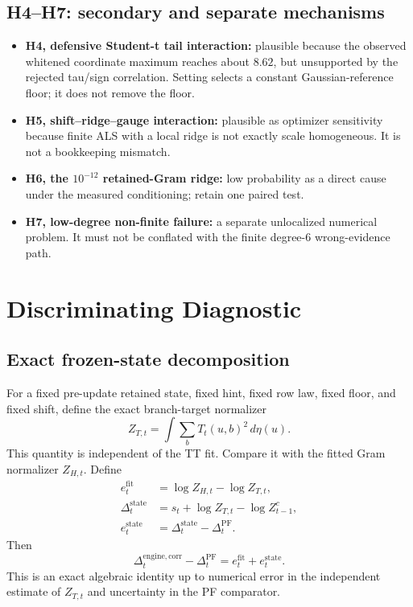 \documentclass[11pt]{article}
\begin{document}
\subsection{H4--H7: secondary and separate mechanisms}

\begin{itemize}
\item \textbf{H4, defensive Student-t tail interaction:} plausible because
the observed whitened coordinate maximum reaches about $8.62$, but unsupported
by the rejected tau/sign correlation. Setting 
selects a constant Gaussian-reference floor; it does not remove the floor.
\item \textbf{H5, shift--ridge--gauge interaction:} plausible as optimizer
sensitivity because finite ALS with a local ridge is not exactly scale
homogeneous. It is not a bookkeeping mismatch.
\item \textbf{H6, the $10^{-12}$ retained-Gram ridge:} low probability as a
direct cause under the measured conditioning; retain one paired test.
\item \textbf{H7, low-degree non-finite failure:} a separate unlocalized
numerical problem. It must not be conflated with the finite degree-6
wrong-evidence path.
\end{itemize}

\section{Discriminating Diagnostic}

\subsection{Exact frozen-state decomposition}

For a fixed pre-update retained state, fixed hint, fixed row law, fixed floor,
and fixed shift, define the exact branch-target normalizer
\begin{equation}
Z_{T,t}=\int\sum_bT_t(u,b)^2\,d\eta(u).
\end{equation}
This quantity is independent of the TT fit. Compare it with the fitted Gram
normalizer $Z_{H,t}$. Define
\begin{align}
e^{\mathrm{fit}}_t
&=\log Z_{H,t}-\log Z_{T,t},\\
\Delta^{\mathrm{state}}_t
&=s_t+\log Z_{T,t}-\log Z^c_{t-1},\\
e^{\mathrm{state}}_t
&=\Delta^{\mathrm{state}}_t-\Delta^{\mathrm{PF}}_t.
\end{align}
Then
\begin{equation}\label{eq:decomp}
\Delta^{\mathrm{engine,corr}}_t-\Delta^{\mathrm{PF}}_t
=e^{\mathrm{fit}}_t+e^{\mathrm{state}}_t.
\end{equation}
This is an exact algebraic identity up to numerical error in the independent
estimate of $Z_{T,t}$ and uncertainty in the PF comparator.
\end{document}
